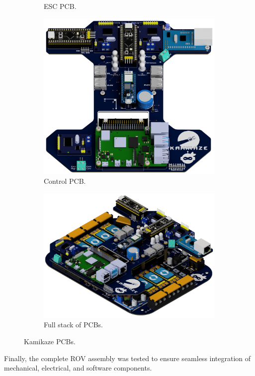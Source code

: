 \begin{figure}[h]
\begin{subfigure}{0.15\columnwidth}
      \caption{ESC PCB.}
    \end{subfigure}
    \hfill
    \begin{subfigure}{0.4\columnwidth}
      \includegraphics[width=\textwidth]{Sections/2Design Rationale/images/Control PCB.png}
      \caption{Control PCB.}
    \end{subfigure}
  
    \vspace{10pt}
    \begin{subfigure}{0.8\columnwidth}
      \includegraphics[width=\textwidth]{Sections/2Design Rationale/images/Full Stack.png}
      \caption{Full stack of PCBs.}
    \end{subfigure}
    \caption{Kamikaze PCBs.}
    \label{fig:pcb}
  \end{figure}

Finally, the complete ROV assembly was tested to ensure seamless integration of mechanical, electrical, and software components.